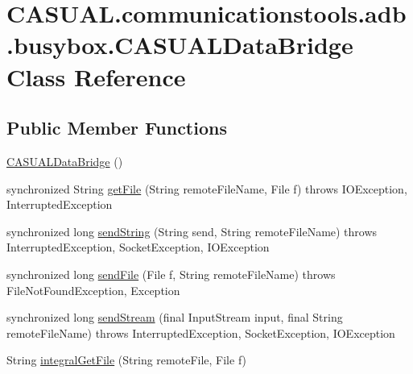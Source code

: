 \hypertarget{class_c_a_s_u_a_l_1_1communicationstools_1_1adb_1_1busybox_1_1_c_a_s_u_a_l_data_bridge}{\section{C\-A\-S\-U\-A\-L.\-communicationstools.\-adb.\-busybox.\-C\-A\-S\-U\-A\-L\-Data\-Bridge Class Reference}
\label{class_c_a_s_u_a_l_1_1communicationstools_1_1adb_1_1busybox_1_1_c_a_s_u_a_l_data_bridge}
}
\subsection*{Public Member Functions}
\begin{DoxyCompactItemize}
\item 
\hyperlink{class_c_a_s_u_a_l_1_1communicationstools_1_1adb_1_1busybox_1_1_c_a_s_u_a_l_data_bridge_ad72d94b5e82945aeb28b4dad758de255}{C\-A\-S\-U\-A\-L\-Data\-Bridge} ()
\item 
synchronized String \hyperlink{class_c_a_s_u_a_l_1_1communicationstools_1_1adb_1_1busybox_1_1_c_a_s_u_a_l_data_bridge_a3c66acf4324f7aedad0a48b2ec87134b}{get\-File} (String remote\-File\-Name, File f)  throws I\-O\-Exception, Interrupted\-Exception 
\item 
synchronized long \hyperlink{class_c_a_s_u_a_l_1_1communicationstools_1_1adb_1_1busybox_1_1_c_a_s_u_a_l_data_bridge_ac3e718541063c8a8430b1bd37ab7233a}{send\-String} (String send, String remote\-File\-Name)  throws Interrupted\-Exception, Socket\-Exception, I\-O\-Exception 
\item 
synchronized long \hyperlink{class_c_a_s_u_a_l_1_1communicationstools_1_1adb_1_1busybox_1_1_c_a_s_u_a_l_data_bridge_aeb4a7a2d55e7f6810d16e1b1a9481904}{send\-File} (File f, String remote\-File\-Name)  throws File\-Not\-Found\-Exception, Exception 
\item 
synchronized long \hyperlink{class_c_a_s_u_a_l_1_1communicationstools_1_1adb_1_1busybox_1_1_c_a_s_u_a_l_data_bridge_a584e36b4ba305e615ad4d08550d0900d}{send\-Stream} (final Input\-Stream input, final String remote\-File\-Name)  throws Interrupted\-Exception, Socket\-Exception, I\-O\-Exception 
\item 
String \hyperlink{class_c_a_s_u_a_l_1_1communicationstools_1_1adb_1_1busybox_1_1_c_a_s_u_a_l_data_bridge_acb739d0cb44821136e9bb0a1f75f9414}{integral\-Get\-File} (String remote\-File, File f)

\end{DoxyCompactItemize}
